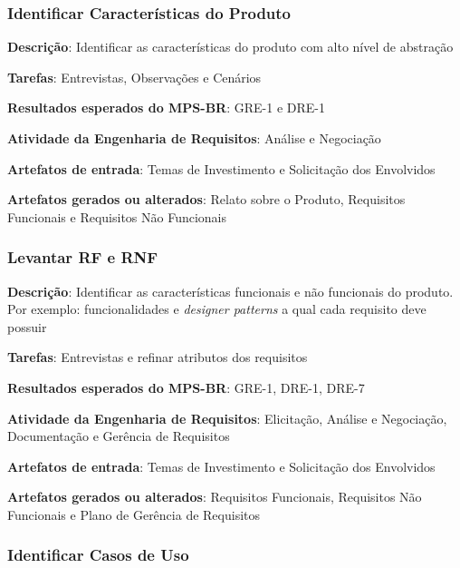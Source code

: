 \subsubsection{Identificar Características do Produto}

\begin{description}
\item\textbf{Descrição}: Identificar as características do produto com alto nível de abstração
\item\textbf{Tarefas}: Entrevistas, Observações e Cenários
\item\textbf{Resultados esperados do MPS-BR}: GRE-1 e DRE-1
\item\textbf{Atividade da Engenharia de Requisitos}: Análise e Negociação
\item\textbf{Artefatos de entrada}: Temas de Investimento e Solicitação dos Envolvidos
\item\textbf{Artefatos gerados ou alterados}: Relato sobre o Produto, Requisitos Funcionais e Requisitos Não Funcionais
\end{description}

\subsubsection{Levantar RF e RNF}

\begin{description}
\item\textbf{Descrição}: Identificar as características funcionais e não funcionais do produto. Por exemplo: funcionalidades e \textit{designer patterns} a qual cada requisito deve possuir
\item\textbf{Tarefas}: Entrevistas e refinar atributos dos requisitos
\item\textbf{Resultados esperados do MPS-BR}: GRE-1, DRE-1, DRE-7
\item\textbf{Atividade da Engenharia de Requisitos}:  Elicitação, Análise e Negociação, Documentação e Gerência de Requisitos
\item\textbf{Artefatos de entrada}: Temas de Investimento e Solicitação dos Envolvidos
\item\textbf{Artefatos gerados ou alterados}: Requisitos Funcionais, Requisitos Não Funcionais e Plano de Gerência de Requisitos
\end{description}

\subsubsection{Identificar Casos de Uso}

